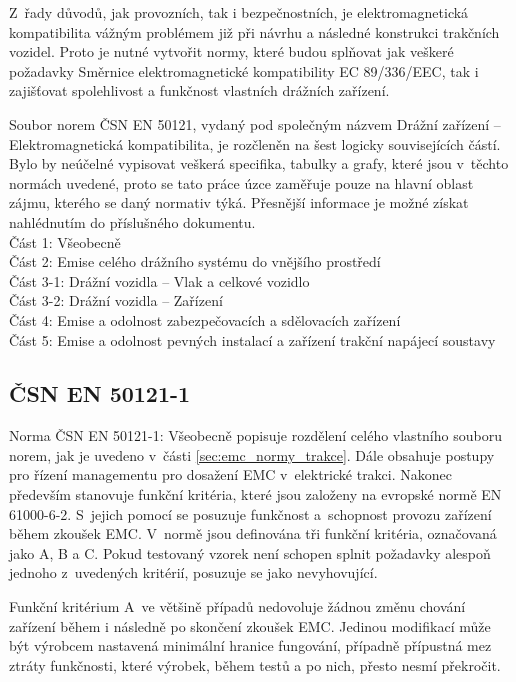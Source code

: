 Z~řady důvodů, jak provozních, tak i bezpečnostních, je elektromagnetická kompatibilita vážným problémem již při návrhu a následné konstrukci trakčních vozidel. Proto je nutné vytvořit normy, které budou splňovat jak veškeré požadavky Směrnice elektromagnetické kompatibility EC 89/336/EEC, tak i zajišťovat spolehlivost a funkčnost vlastních drážních zařízení.

Soubor norem ČSN EN 50121, vydaný pod společným názvem Drážní zařízení – Elektromagnetická kompatibilita, je rozčleněn na šest logicky souvisejících částí. Bylo by neúčelné vypisovat veškerá specifika, tabulky a grafy, které jsou v~těchto normách uvedené, proto se tato práce úzce zaměřuje pouze na hlavní oblast zájmu, kterého se daný normativ týká. Přesnější informace je možné získat nahlédnutím do příslušného dokumentu. \bigskip \\
Část 1: Všeobecně\\
Část 2: Emise celého drážního  systému do vnějšího prostředí\\
Část 3-1: Drážní vozidla – Vlak a celkové vozidlo\\
Část 3-2: Drážní vozidla – Zařízení\\
Část 4: Emise a odolnost zabezpečovacích a sdělovacích zařízení\\
Část 5: Emise a odolnost pevných instalací a zařízení trakční napájecí soustavy\\

\subsection{ČSN EN 50121-1}
Norma ČSN EN 50121-1: Všeobecně popisuje rozdělení celého vlastního souboru norem, jak je uvedeno v~části \ref{sec:emc_normy_trakce}. Dále obsahuje postupy pro řízení managementu pro dosažení EMC v~elektrické trakci. Nakonec především stanovuje funkční kritéria, které jsou založeny na evropské normě EN 61000-6-2. S~jejich pomocí se posuzuje funkčnost a~schopnost provozu zařízení během zkoušek EMC. V~normě jsou definována tři funkční kritéria, označovaná jako A, B a C. Pokud testovaný vzorek není schopen splnit požadavky alespoň jednoho z~uvedených kritérií, posuzuje se jako nevyhovující.

Funkční kritérium A~ve většině případů nedovoluje žádnou změnu chování zařízení během i následně po skončení zkoušek EMC. Jedinou modifikací může být výrobcem nastavená minimální hranice fungování, případně přípustná mez ztráty funkčnosti, které výrobek, během testů a po nich, přesto nesmí překročit.

